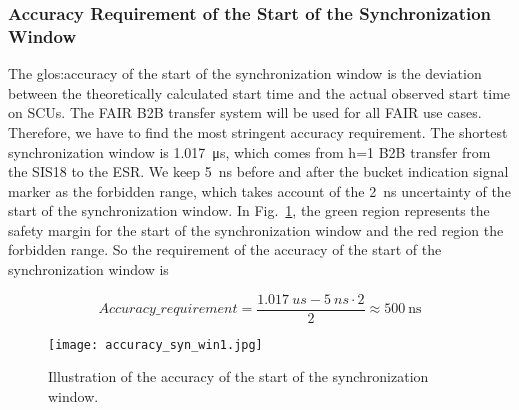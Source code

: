 \subsubsection{Accuracy Requirement of the Start of the Synchronization Window}
\label{cal_accuracy}
The \gls{glos:accuracy} of the start of the synchronization window is the deviation between the theoretically calculated start time and the actual observed start time on SCUs. The FAIR B2B transfer system will be used for all FAIR use cases. Therefore, we have to find the most stringent accuracy requirement. The shortest synchronization window is \SI{1.017}{\us}, which comes from h=1 B2B transfer from the SIS18 to the ESR. We keep \SI{5}{ns} before and after the bucket indication signal marker as the forbidden range, which takes account of the \SI{2}{ns} uncertainty of the start of the synchronization window. In Fig.~\ref{accuracy_syn_win1}, the green region represents the safety margin for the start of the synchronization window and the red region the forbidden range. So the requirement of the accuracy of the start of the synchronization window is 

\begin{equation}
Accuracy\_requirement=\frac{\SI{1.017}{us}-\SI{5}{ns} \cdot 2}{2} \approx  \SI{500}{\ns}\label{accu}
\end{equation}

\begin{figure}[!htb]
   \centering   
   \texttt{[image: accuracy\_syn\_win1.jpg]}
   \caption{Illustration of the accuracy of the start of the synchronization window.}
   \label{accuracy_syn_win1}
\end{figure}




